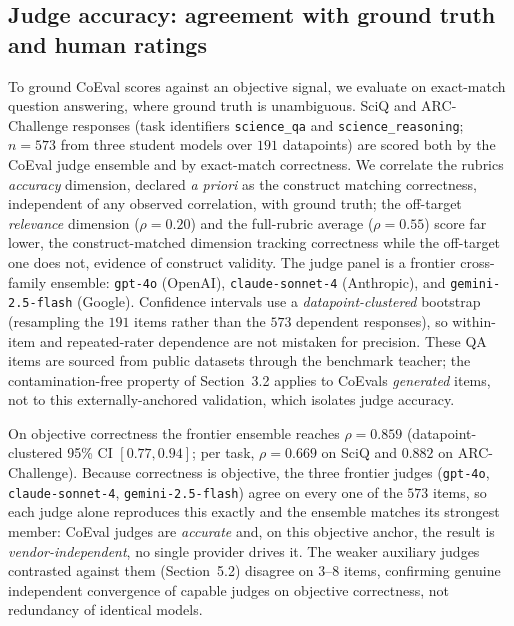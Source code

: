 \documentclass[11pt,a4paper]{article}
\begin{document}
\subsection{Judge accuracy: agreement with ground truth and human ratings}\label{judge-accuracy-agreement-with-ground-truth-and-human-ratings}

To ground CoEval scores against an objective signal, we evaluate on exact-match question answering, where ground
truth is unambiguous. SciQ and ARC-Challenge responses (task identifiers \texttt{science\_qa} and \texttt{science\_reasoning}; \(n=573\) from three student models over \(191\) datapoints)
are scored both by the CoEval judge ensemble and by exact-match correctness. We correlate the rubric\textquotesingle s \emph{accuracy}
dimension, declared \emph{a priori} as the construct matching correctness, independent of any observed
correlation, with ground truth; the off-target \emph{relevance} dimension
(\(\rho = 0.20\)) and the full-rubric average (\(\rho = 0.55\)) score far lower, the construct-matched dimension
tracking correctness while the off-target one does not, evidence of construct validity. The judge panel is a frontier cross-family ensemble: \texttt{gpt-4o} (OpenAI),
\texttt{claude-sonnet-4} (Anthropic), and \texttt{gemini-2.5-flash} (Google). Confidence intervals use a
\emph{datapoint-clustered} bootstrap (resampling the \(191\) items rather than the \(573\) dependent responses), so
within-item and repeated-rater dependence are not mistaken for precision. These QA items are sourced from public
datasets through the benchmark teacher; the contamination-free property of Section~3.2 applies to CoEval\textquotesingle s
\emph{generated} items, not to this externally-anchored validation, which isolates judge accuracy.

On objective correctness the frontier ensemble reaches \(\rho = 0.859\) (datapoint-clustered 95\% CI \([0.77, 0.94]\);
per task, \(\rho = 0.669\) on SciQ and \(0.882\) on ARC-Challenge). Because correctness is objective, the three frontier
judges (\texttt{gpt-4o}, \texttt{claude-sonnet-4}, \texttt{gemini-2.5-flash}) agree on every one of the
\(573\) items, so each judge alone reproduces this exactly and the ensemble matches its strongest member: CoEval judges
are \emph{accurate} and, on this objective anchor, the result is \emph{vendor-independent}, no single provider drives it. The weaker
auxiliary judges contrasted against them (Section~5.2) disagree on 3--8 items, confirming genuine independent
convergence of capable judges on objective correctness, not redundancy of identical models.
\end{document}
